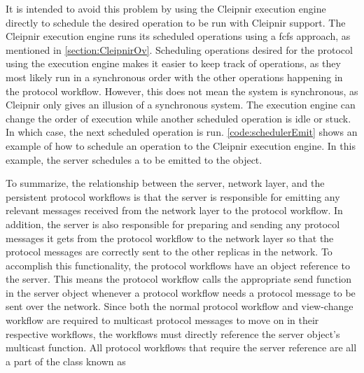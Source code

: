 It is intended to avoid this problem by using the Cleipnir execution engine directly to schedule the desired operation to be run with Cleipnir support. The Cleipnir execution engine runs its scheduled operations using a \ac{fcfs} approach, as mentioned in \autoref{section:CleipnirOv}. Scheduling operations desired for the protocol using the execution engine makes it easier to keep track of operations, as they most likely run in a synchronous order with the other operations happening in the protocol workflow. However, this does not mean the system is synchronous, as Cleipnir only gives an illusion of a synchronous system. The execution engine can change the order of execution while another scheduled operation is idle or stuck. In which case, the next scheduled operation is run. \autoref{code:schedulerEmit} shows an example of how to schedule an operation to the Cleipnir execution engine. In this example, the server schedules a  to be emitted to the   object.

To summarize, the relationship between the server, network layer, and the persistent protocol workflows is that the server is responsible for emitting any relevant messages received from the network layer to the protocol workflow. In addition, the server is also responsible for preparing and sending any protocol messages it gets from the protocol workflow to the network layer so that the protocol messages are correctly sent to the other replicas in the network. To accomplish this functionality, the protocol workflows have an object reference to the server. This means the protocol workflow calls the appropriate send function in the server object whenever a protocol workflow needs a protocol message to be sent over the network. Since both the normal protocol workflow and view-change workflow are required to multicast protocol messages to move on in their respective workflows, the workflows must directly reference the server object’s multicast function. All protocol workflows that require the server reference are all a part of the class known as  

